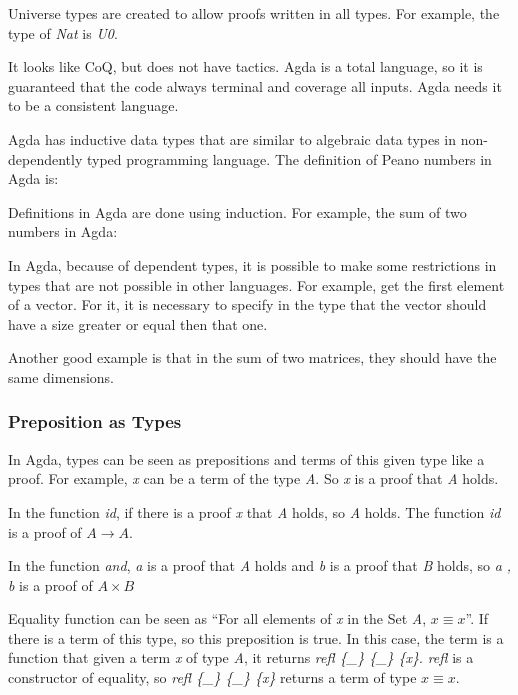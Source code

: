     Universe types are created to allow proofs written in all types.
    For example, the type of \emph{Nat} is \emph{U0}.


It looks like CoQ, but does not have tactics.
Agda is a total language, so it is guaranteed that the code always terminal and coverage all inputs.
Agda needs it to be a consistent language.

Agda has inductive data types that are similar to algebraic data types in non-dependently
typed programming language.
The definition of Peano numbers in Agda is:


Definitions in Agda are done using induction.
For example, the sum of two numbers in Agda:


In Agda, because of dependent types, it is possible to make some restrictions in types that are not
possible in other languages.
For example, get the first element of a vector.
For it, it is necessary to specify in the type that the vector should have a size greater or equal
then that one.


Another good example is that in the sum of two matrices, they should have the same dimensions.


\subsubsection{Preposition as Types}

In Agda, types can be seen as prepositions and terms of this given type like a proof.
For example, \emph{x} can be a term of the type \emph{A}.
So \emph{x} is a proof that \emph{A} holds.


In the function \emph{id},
if there is a proof \emph{x} that \emph{A} holds,
so \emph{A} holds.
The function \emph{id} is a proof of $A \rightarrow A$.


In the function \emph{and}, \emph{a} is a proof that \emph{A} holds and
\emph{b} is a proof that \emph{B} holds,
so \emph{a , b} is a proof of $A \times B$


Equality function can be seen as
``For all elements of \emph{x} in the Set \emph{A}, $x \equiv x$''.
If there is a term of this type, so this preposition is true.
In this case, the term is a function that given a term \emph{x} of type \emph{A},
it returns \emph{refl \{\_\} \{\_\} \{x\}}.
\emph{refl} is a constructor of equality, so \emph{refl \{\_\} \{\_\} \{x\}}
returns a term of type $x \equiv x$.

